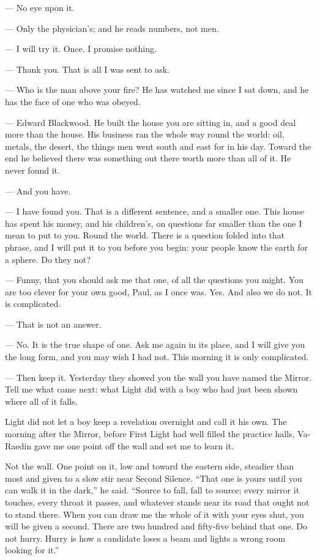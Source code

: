 \begin{room}
--- No eye upon it.

--- Only the physician's; and he reads numbers, not men.

--- I will try it. Once. I promise nothing.

--- Thank you. That is all I was sent to ask.

--- Who is the man above your fire? He has watched me since I sat down, and he has the face of one who was obeyed.

--- Edward Blackwood. He built the house you are sitting in, and a good deal more than the house. His business ran the whole way round the world: oil, metals, the desert, the things men went south and east for in his day. Toward the end he believed there was something out there worth more than all of it. He never found it.

--- And you have.

--- I have found you. That is a different sentence, and a smaller one. This house has spent his money, and his children's, on questions far smaller than the one I mean to put to you. Round the world. There is a question folded into that phrase, and I will put it to you before you begin: your people know the earth for a sphere. Do they not?

--- Funny, that you should ask me that one, of all the questions you might. You are too clever for your own good, Paul, as I once was. Yes. And also we do not. It is complicated.

--- That is not an answer.

--- No. It is the true shape of one. Ask me again in its place, and I will give you the long form, and you may wish I had not. This morning it is only complicated.

--- Then keep it. Yesterday they showed you the wall you have named the Mirror. Tell me what came next: what Light did with a boy who had just been shown where all of it falls.

\end{room}

\ornament

\noindent Light did not let a boy keep a revelation overnight and call it his own. The morning after the Mirror, before First Light had well filled the practice halls, Va-Raedin gave me one point off the wall and set me to learn it.\par

Not the wall. One point on it, low and toward the eastern side, steadier than most and given to a slow stir near Second Silence. ``That one is yours until you can walk it in the dark,'' he said. ``Source to fall, fall to source; every mirror it touches, every throat it passes, and whatever stands near its road that ought not to stand there. When you can draw me the whole of it with your eyes shut, you will be given a second. There are two hundred and fifty-five behind that one. Do not hurry. Hurry is how a candidate loses a beam and lights a wrong room looking for it.''\par

